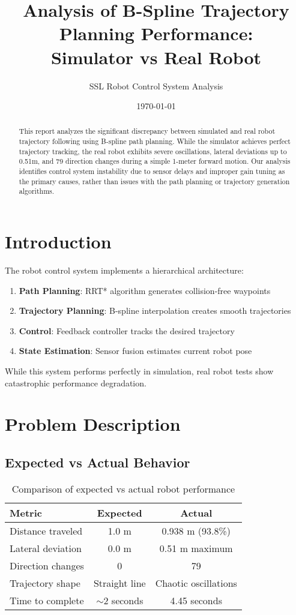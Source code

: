 \documentclass[12pt,a4paper]{article}
\title{Analysis of B-Spline Trajectory Planning Performance:\\Simulator vs Real Robot}
\author{SSL Robot Control System Analysis}
\date{\today}
\begin{document}
\maketitle

\begin{abstract}
This report analyzes the significant discrepancy between simulated and real robot trajectory following using B-spline path planning. While the simulator achieves perfect trajectory tracking, the real robot exhibits severe oscillations, lateral deviations up to 0.51m, and 79 direction changes during a simple 1-meter forward motion. Our analysis identifies control system instability due to sensor delays and improper gain tuning as the primary causes, rather than issues with the path planning or trajectory generation algorithms.
\end{abstract}

\section{Introduction}

The robot control system implements a hierarchical architecture:
\begin{enumerate}
    \item \textbf{Path Planning}: RRT* algorithm generates collision-free waypoints
    \item \textbf{Trajectory Planning}: B-spline interpolation creates smooth trajectories
    \item \textbf{Control}: Feedback controller tracks the desired trajectory
    \item \textbf{State Estimation}: Sensor fusion estimates current robot pose
\end{enumerate}

While this system performs perfectly in simulation, real robot tests show catastrophic performance degradation.

\section{Problem Description}

\subsection{Expected vs Actual Behavior}

\begin{table}[H]
\centering
\begin{tabular}{|l|c|c|}
\hline
\textbf{Metric} & \textbf{Expected} & \textbf{Actual} \\
\hline
Distance traveled & 1.0 m & 0.938 m (93.8\%) \\
Lateral deviation & 0.0 m & 0.51 m maximum \\
Direction changes & 0 & 79 \\
Trajectory shape & Straight line & Chaotic oscillations \\
Time to complete & $\sim$2 seconds & 4.45 seconds \\
\hline
\end{tabular}
\caption{Comparison of expected vs actual robot performance}
\end{table}
\end{document}
